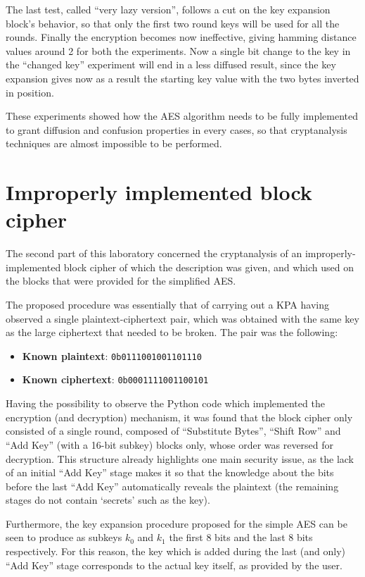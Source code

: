 \documentclass[12pt]{article}
\begin{document}
The last test, called ``very lazy version'', follows a cut on the key expansion block's behavior, so that only the first two round keys will be used for all the rounds. Finally the encryption becomes now ineffective, giving hamming distance values around {\color{blue}2} for both the experiments. Now a single bit change to the key in the ``changed key'' experiment will end in a less diffused result, since the key expansion gives now as a result the starting key value with the two bytes inverted in position.

These experiments showed how the AES algorithm needs to be fully implemented to grant diffusion and confusion properties in every cases, so that cryptanalysis techniques are almost impossible to be performed.


\section{Improperly implemented block cipher}
\label{sec:03}

The second part of this laboratory concerned the cryptanalysis of an improperly-implemented block cipher of which the description was given, and which used on the blocks that were provided for the simplified AES.\@

The proposed procedure was essentially that of carrying out a KPA having observed a single plaintext-ciphertext pair, which was obtained with the same key as the large ciphertext that needed to be broken.
The pair was the following:

\begin{itemize}
   \item \textbf{Known plaintext}: \verb|0b0111001001101110|
   \item \textbf{Known ciphertext}: \verb|0b0001111001100101| 
\end{itemize}

Having the possibility to observe the Python code which implemented the encryption (and decryption) mechanism, it was found that the block cipher only consisted of a single round, composed of ``Substitute Bytes'', ``Shift Row'' and ``Add Key'' (with a 16-bit subkey) blocks only, whose order was reversed for decryption.
This structure already highlights one main security issue, as the lack of an initial ``Add Key'' stage makes it so that the knowledge about the bits before the last ``Add Key'' automatically reveals the plaintext (the remaining stages do not contain `secrets' such as the key).

Furthermore, the key expansion procedure proposed for the simple AES can be seen to produce as subkeys $k_0$ and $k_1$ the first 8 bits and the last 8 bits respectively. For this reason, the key which is added during the last (and only) ``Add Key'' stage corresponds to the actual key itself, as provided by the user.
\end{document}

